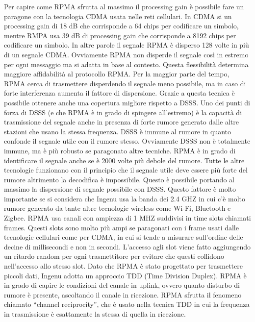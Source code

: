 \documentclass[12pt,a4paper,openright,twoside]{report}
\begin{document}
Per capire come RPMA sfrutta al massimo il processing gain \`e possibile fare un paragone con la tecnologia CDMA usata nelle reti cellulari. 
In CDMA si un processing gain di 18 dB che corrisponde a 64 chips per codificare un simbolo, mentre RMPA usa 39 dB di processing gain che corrisponde a 8192 chips per codificare un simbolo. 
In altre parole il segnale RPMA \`e disperso 128 volte in pi\`u di un segnale CDMA. 
Ovviamente RPMA non disperde il segnale cos\`i in estremo per ogni messaggio ma si adatta in base al contesto. 
Questa flessibilit\`a determina maggiore affidabilit\`a al protocollo RPMA.
Per la maggior parte del tempo, RPMA cerca di trasmettere disperdendo il segnale meno possibile, ma in caso di forte interferenza aumenta il fattore di dispersione. 
Grazie a questa tecnica \`e possibile ottenere anche una copertura migliore rispetto a DSSS.
Uno dei punti di forza di DSSS (e che RPMA \`e in grado di spingere all'estremo) \`e la capacit\`a di trasmissione del segnale anche in presenza di forte rumore generato dalle altre stazioni che usano la stessa frequenza. 
DSSS \`e immune al rumore in quanto confonde il segnale utile con il rumore stesso. Ovviamente DSSS non \`e totalmente immune, ma \`e pi\`u robusto se paragonato altre tecniche. 
RPMA \`e in grado di identificare il segnale anche se \`e 2000 volte pi\`u debole del rumore. Tutte le altre tecnologie funzionano con il principio che il segnale utile deve essere pi\`u forte del rumore altrimento la decodifica \`e impossibile. 
Questo \`e possibile portando al massimo la dispersione di segnale possibile con DSSS. Questo fattore \`e molto importante se si considera che Ingenu usa la banda dei 2.4 GHZ in cui c'\`e molto rumore generato da tante altre tecnologie wireless come Wi-Fi, Bluetooth e Zigbee.  
RPMA usa canali con ampiezza di 1 MHZ suddivisi in time slots chiamati frames. 
Questi slots sono molto pi\`u ampi se paragonati con i frame usati dalle tecnologie cellulari come per CDMA, in cui si tende a misurare sull'ordine delle decine di millisecondi e non in secondi. 
L'accesso agli slot viene fatto aggiungendo un ritardo random per ogni trasmettitore per evitare che questi collidono nell'accesso allo stesso slot.
Dato che RPMA \`e stato progettato per trasmettere piccoli dati, Ingenu adotta un approccio TDD (Time Division Duplex). RPMA \`e in grado di capire le condizioni del canale in uplink, ovvero quanto disturbo di rumore \`e presente, ascoltando il canale in ricezione. 
RPMA sfrutta il fenomeno chiamato ``channel reciprocity'', che \`e usato nella tecnica TDD in cui la frequenza in trasmissione \`e esattamente la stessa di quella in ricezione. 
\end{document}
